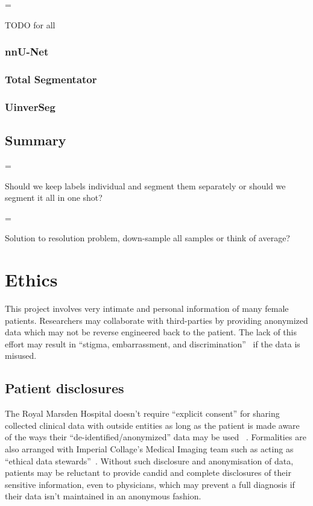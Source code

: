 \documentclass[11pt,twoside]{report}
\newenvironment{warning}
  {\par\begin{mdframed}[linewidth=1pt,linecolor=black]%
    \begin{list}{}{\leftmargin=1cm
                   \labelwidth=\leftmargin}\item[\Large\ding{43}]}
  {\end{list}\end{mdframed}\par}
\begin{document}
\begin{warning}
  TODO for all
\end{warning}

\subsection{nnU-Net}\label{sect:results-nnu-net}

\subsection{Total Segmentator}\label{sect:results-totalseg}

\subsection{UinverSeg}\label{sect:results-universeg}

\section{Summary}\label{sect:results-summary}


\begin{warning}
  Should we keep labels individual and segment them separately or should we segment it all in one shot?
\end{warning}

\begin{warning}
  Solution to resolution problem, down-sample all samples or think of average?
\end{warning}

\chapter{Ethics}\label{sect:ethics}

This project involves very intimate and personal information of many female patients. Researchers may collaborate with third-parties by providing anonymized data which may not be reverse engineered back to the patient.
The lack of this effort may result in ``stigma, embarrassment, and discrimination''~\cite{health-privacy} if the data is misused.

\section{Patient disclosures}\label{sect:patient-disclosures}

The Royal Marsden Hospital doesn't require ``explicit consent'' for sharing collected clinical data with outside entities as long as the patient is made aware of the ways their ``de-identified/anonymized'' data may be used ~\cite{royal-marsden-privacy-note}. Formalities are also arranged with Imperial Collage's Medical Imaging team such as acting as ``ethical data stewards''~\cite{ethics-imaging-AI}. Without such disclosure and anonymisation of data, patients may be reluctant to provide candid and complete disclosures of their sensitive information, even to physicians, which may prevent a full diagnosis if their data isn't maintained in an anonymous fashion.
\end{document}
